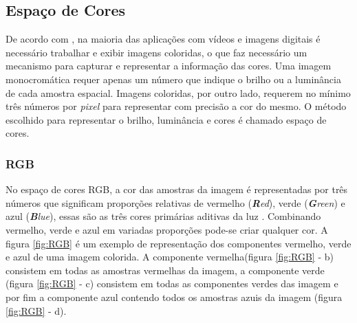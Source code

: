 \subsection{Espaço de Cores}

De acordo com , na maioria das aplicações com vídeos e imagens digitais é necessário trabalhar e exibir imagens coloridas, o que faz necessário um mecanismo para capturar e representar a informação das cores. Uma imagem monocromática requer apenas um número que indique o brilho ou a luminância de cada amostra espacial. Imagens coloridas, por outro lado, requerem no mínimo três números por \textit{pixel} para representar com precisão a cor do mesmo. O método escolhido para representar o brilho, luminância e cores é chamado espaço de cores.

\subsubsection{RGB}

No espaço de cores RGB, a cor das amostras da imagem é representadas por três números que significam proporções relativas de vermelho (\textit{\textbf{R}ed}), verde (\textit{\textbf{G}reen}) e azul (\textit{\textbf{B}lue}), essas são as três cores primárias aditivas da luz \cite{richardson2011h}.	Combinando vermelho, verde e azul em variadas proporções pode-se criar qualquer cor. A figura \ref{fig:RGB} é um exemplo de representação dos componentes vermelho, verde e azul de uma imagem colorida. A componente vermelha(figura \ref{fig:RGB} - b) consistem em todas as amostras vermelhas da imagem, a componente verde (figura \ref{fig:RGB} - c) consistem em todas as componentes verdes das imagem e por fim a componente azul contendo todos os amostras azuis da imagem (figura \ref{fig:RGB} - d).

